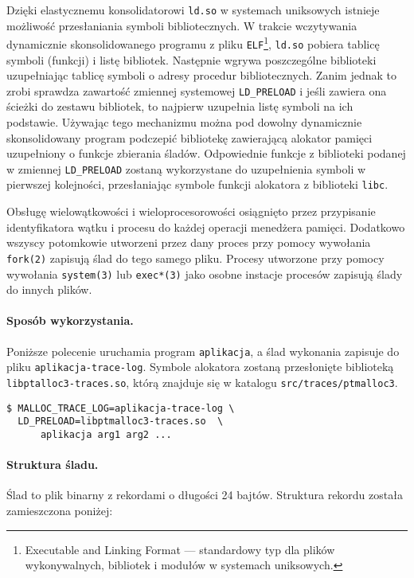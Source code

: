 \documentclass[12pt,a4paper,titlepage,twoside]{mwart}
\begin{document}
Dzięki elastycznemu konsolidatorowi \texttt{ld.so} w systemach uniksowych
istnieje możliwość przesłaniania symboli bibliotecznych. W trakcie wczytywania
dynamicznie skonsolidowanego programu z pliku \texttt{ELF}\footnote{Executable
and Linking Format --- standardowy typ dla plików wykonywalnych, bibliotek i
modułów w systemach uniksowych.}, \texttt{ld.so} pobiera tablicę symboli
(funkcji) i listę bibliotek. Następnie wgrywa poszczególne biblioteki
uzupełniając tablicę symboli o adresy procedur bibliotecznych. Zanim jednak to
zrobi sprawdza zawartość zmiennej systemowej \texttt{LD\_PRELOAD} i jeśli
zawiera ona ścieżki do zestawu bibliotek, to najpierw uzupełnia listę symboli
na ich podstawie. Używając tego mechanizmu można pod dowolny dynamicznie
skonsolidowany program podczepić bibliotekę zawierającą alokator pamięci
uzupełniony o funkcje zbierania śladów. Odpowiednie funkcje z biblioteki
podanej w zmiennej \texttt{LD\_PRELOAD} zostaną wykorzystane do uzupełnienia
symboli w pierwszej kolejności, przesłaniając symbole funkcji alokatora z
biblioteki \texttt{libc}.

Obsługę wielowątkowości i wieloprocesorowości osiągnięto przez przypisanie
identyfikatora wątku i procesu do każdej operacji menedżera pamięci. Dodatkowo
wszyscy potomkowie utworzeni przez dany proces przy pomocy wywołania
\texttt{fork(2)} zapisują ślad do tego samego pliku. Procesy utworzone przy
pomocy wywołania \texttt{system(3)} lub \texttt{exec*(3)} jako osobne instacje
procesów zapisują ślady do innych plików.

\paragraph{Sposób wykorzystania.} Poniższe polecenie uruchamia program
\texttt{aplikacja}, a ślad wykonania zapisuje do pliku
\texttt{aplikacja-trace-log}. Symbole alokatora zostaną przesłonięte
biblioteką \texttt{libptalloc3-traces.so}, którą znajduje się w katalogu
\texttt{src/traces/ptmalloc3}.
\begin{center}
\begin{verbatim}
$ MALLOC_TRACE_LOG=aplikacja-trace-log \
  LD_PRELOAD=libptmalloc3-traces.so  \
      aplikacja arg1 arg2 ...
\end{verbatim}
\end{center}

\paragraph{Struktura śladu.} Ślad to plik binarny z rekordami o długości 24
bajtów. Struktura rekordu została zamieszczona poniżej:
\end{document}
